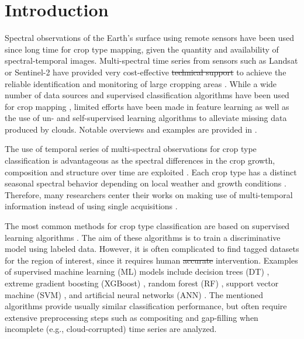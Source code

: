 \documentclass[journal,article,submit,pdftex,moreauthors]{Definitions/mdpi}
\providecommand{\DIFadd}[1]{{\protect\color{blue}\uwave{#1}}} %
\providecommand{\DIFdel}[1]{{\protect\color{red}\sout{#1}}}                      %
\providecommand{\DIFaddbegin}{} %
\providecommand{\DIFaddend}{} %
\providecommand{\DIFdelbegin}{} %
\providecommand{\DIFdelend}{} %
\begin{document}

\section{Introduction}
Spectral observations of the Earth's surface using remote sensors have been used since long time for crop type mapping, 
given the quantity and availability of spectral-temporal images. 
Multi-spectral time series from sensors such as Landsat or Sentinel-2 \DIFaddbegin \DIFadd{(S2) }\DIFaddend have provided very cost-effective \DIFdelbegin \DIFdel{technical support }\DIFdelend \DIFaddbegin \DIFadd{data }\DIFaddend to achieve the reliable identification and monitoring of large cropping areas \cite{Vuolo2018, Pelletier2019, Foerster2012, Chen2022, Tariq2022, Gao2021}. 
While a wide number of data sources and supervised classification algorithms have been used for crop mapping \cite{Palchowdhuri2018,Heupel2018,Li2023,Dong2020,Paris2020,Russwurm2020,Nowakowski2021,Chen2022,Gadiraju2023, Wu2022}, limited efforts have been made in feature learning as well as the use of un- and self-supervised learning algorithms to alleviate missing data produced by clouds. Notable overviews and examples are provided in \cite{Yin2020,Yi2020,He2022, Dumeur2024, Wang2019}.

The use of temporal series of multi-spectral observations for crop type classification is advantageous as the spectral differences in the crop growth, composition and structure over time are exploited \cite{Vuolo2018,Yi2020, Gao2021, Maponya2020}.
Each crop type has a distinct seasonal spectral behavior depending on local weather and growth conditions \cite{Foerster2012,Gao2021,Russwurm2020}. 
Therefore, many researchers center their works on making use of multi-temporal information instead of
using single acquisitions \cite{Hu2016,Vuolo2018, Dong2020, Roy2020}.

The most common methods for crop type classification are based on supervised learning algorithms \cite{Kussul2017,Inglada2017,Cai2018,Feng2019,Zhong2019,Maponya2020,Russwurm2020,Prins2020,Chen2022,ManishLad2022, Agilandeeswari2022,Wu2022,Gadiraju2023,Tian2023}. 
The aim of these algorithms is to train a discriminative model using labeled data. However, it is often complicated to find tagged datasets for the region of interest, since it requires human \DIFdelbegin \DIFdel{accurate }\DIFdelend intervention. Examples of supervised machine learning (ML) models include decision trees (DT) \cite{Rokach2005}, extreme gradient boosting (XGBoost) \cite{Chen2016}, random forest (RF) \cite{Breiman2001}, support vector machine (SVM) \cite{cortes1995}, and artificial neural networks (ANN) \cite{Rosenblatt1958}.
The mentioned algorithms provide usually similar classification performance, but often require extensive preprocessing steps such as compositing and gap-filling when incomplete (e.g., cloud-corrupted) time series are analyzed.
\end{document}
